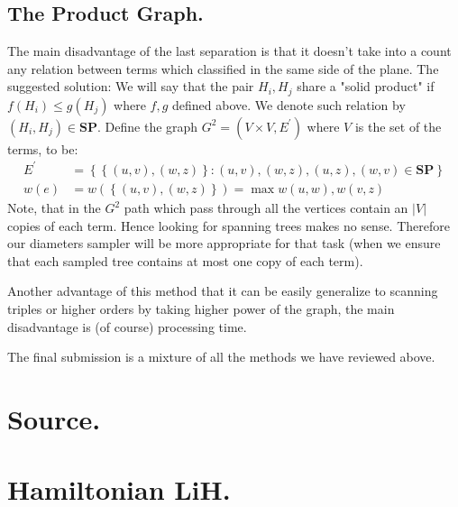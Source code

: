 \documentclass{article}
\begin{document}
\begin{multicols*}{2}
\section{The Product Graph.}
The main disadvantage of the last separation is that it doesn't take into a count any relation between terms which classified in the same side of the plane. The suggested solution: We will say that the pair \(H_i, H_j\) share a "solid product" if  \( f\left(H_{i}\right) \le g \left(H_{j}\right) \) where \(f,g\) defined above. We denote such relation by \(\left(H_i, H_j\right) \in \textbf{SP} \). Define the graph \(G^2 = \left(V\times V , E^{\prime}\right)\) where \(V\) is the set of the terms, to be: 
\begin{equation*}
    \begin{split}
        E^{\prime} &= \left\{ \left\{ (u,v),(w,z) \right\} : (u,v),(w,z),(u,z),(w,v) \in \textbf{SP} \right\}  \\
        w(e) &= w\left( \left\{ (u,v),(w,z) \right\} \right) = \max { w(u,w),w(v,z) }
    \end{split}
\end{equation*}
Note, that in the \(G^2\) path which pass through all the vertices contain an \(|V|\) copies of each term. Hence looking for spanning trees makes no sense. Therefore our diameters sampler will be more appropriate for that task (when we ensure that each sampled tree contains at most one copy of each term).          

Another advantage of this method that it can be easily generalize to scanning triples or higher orders by taking higher power of the graph, the main disadvantage is (of course) processing time.       

The final submission is a mixture of all the methods we have reviewed above.   

\printbibliography 
\end{multicols*}
\section{Source.}

\section{Hamiltonian LiH.}

\end{document}
